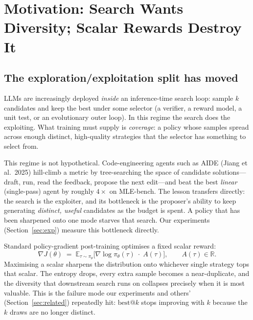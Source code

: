 \documentclass[11pt,a4paper]{article}
\makeatletter
\newcommand{\R}{\mathbb{R}}
\newcommand{\E}{\mathbb{E}}
\newcommand{\bestk}{\textrm{best}@k}
\makeatother
\begin{document}
\tableofcontents
\newpage

\section{Motivation: Search Wants Diversity; Scalar Rewards Destroy It}
\label{sec:motivation}

\subsection{The exploration/exploitation split has moved}

LLMs are increasingly deployed \emph{inside} an inference-time search loop:
sample $k$ candidates and keep the best under some selector (a verifier, a
reward model, a unit test, or an evolutionary outer loop).  In this regime
the search does the exploiting.  What training must supply is
\emph{coverage}: a policy whose samples spread across enough distinct,
high-quality strategies that the selector has something to select from.

This regime is not hypothetical.  Code-engineering agents such as AIDE
(Jiang et al.\ 2025) hill-climb a metric by tree-searching the space of
candidate solutions---draft, run, read the feedback, propose the next
edit---and beat the best \emph{linear} (single-pass) agent by roughly
$4\times$ on MLE-bench.  The lesson transfers directly: the search is the
exploiter, and its bottleneck is the proposer's ability to keep generating
\emph{distinct, useful} candidates as the budget is spent.  A policy that has
been sharpened onto one mode starves that search.  Our experiments
(Section~\ref{sec:exp}) measure this bottleneck directly.

Standard policy-gradient post-training optimises a fixed scalar reward:
\begin{equation}
  \nabla J(\theta) \;=\; \E_{\tau \sim \pi_\theta}\!\Big[
    \nabla \log \pi_\theta(\tau) \;\cdot\; A(\tau)
  \Big],
  \qquad A(\tau) \in \R.
  \label{eq:pg-scalar}
\end{equation}
Maximising a scalar sharpens the distribution onto whichever single
strategy tops that scalar.  The entropy drops, every extra sample becomes a
near-duplicate, and the diversity that downstream search runs on collapses
precisely when it is most valuable.  This is the failure mode our
experiments and others' (Section~\ref{sec:related}) repeatedly hit: $\bestk$
stops improving with $k$ because the $k$ draws are no longer distinct.
\end{document}
